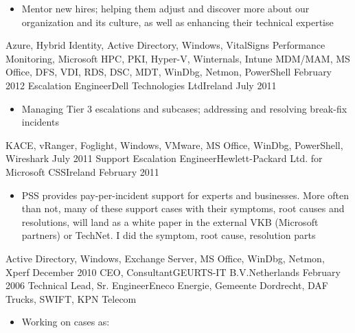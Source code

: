 \begin{experiences}
{\begin{itemize}
                        \item Mentor new hires; helping them adjust and discover more about our organization and its culture, as well as enhancing their technical expertise
                      \end{itemize}
                    }
                    {Azure, Hybrid Identity, Active Directory, Windows, VitalSigns Performance Monitoring, Microsoft HPC, PKI, Hyper-V, Winternals, Intune MDM/MAM, MS Office, DFS, VDI, RDS, DSC, MDT, WinDbg, Netmon, PowerShell}
  \emptySeparator
  \experience
  {February 2012}   {Escalation Engineer}{Dell Technologies Ltd}{Ireland}
  {July 2011}       {
                      \begin{itemize}
                        \item Managing Tier 3 escalations and subcases; addressing and resolving break-fix incidents                                
                      \end{itemize}
                    }
                    {KACE, vRanger, Foglight, Windows, VMware, MS Office, WinDbg, PowerShell, Wireshark}
  \emptySeparator
  \experience
  {July 2011}       {Support Escalation Engineer}{Hewlett-Packard Ltd. for Microsoft CSS}{Ireland}
  {February 2011}   {                    
                      \begin{itemize}
                        \item PSS provides pay-per-incident support for experts and businesses. More often than not, many of these support cases with their symptoms, root causes and resolutions, will land as a white paper in the external VKB (Microsoft partners) or TechNet. I did the symptom, root cause, resolution parts                                        
                      \end{itemize}
                    }
                    {Active Directory, Windows, Exchange Server, MS Office, WinDbg, Netmon, Xperf}
  \emptySeparator   
  \consultantexperience
  {December 2010}   {CEO, Consultant}{GEURTS-IT B.V.}{Netherlands}
  {February 2006}   {Technical Lead, Sr. Engineer}{Eneco Energie, Gemeente Dordrecht, DAF Trucks, SWIFT, KPN Telecom}
                    {
                      \begin{itemize}
                        \item Working on cases as:
                        

\end{itemize}}
\end{experiences}
